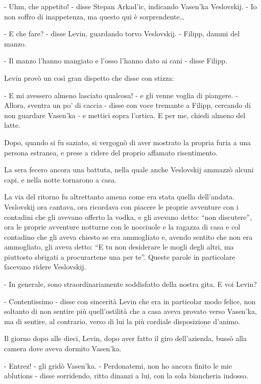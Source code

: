 - Uhm, che appetito! - disse Stepan Arkad'ic, indicando Vasen'ka Veslovskij. - Io non soffro di inappetenza, ma questo qui è sorprendente\ldots{} 

- E che fare? - disse Levin, guardando torvo Veslovskij. - Filipp, dammi del manzo. 

- Il manzo l'hanno mangiato e l'osso l'hanno dato ai cani - disse Filipp. 

Levin provò un così gran dispetto che disse con stizza: 

- E mi avessero almeno lasciato qualcosa! - e gli venne voglia di piangere. - Allora, sventra un po' di caccia - disse con voce tremante a Filipp, cercando di non guardare Vasen'ka - e mettici sopra l'ortica. E per me, chiedi almeno del latte. 

Dopo, quando si fu saziato, si vergognò di aver mostrato la propria furia a una persona estranea, e prese a ridere del proprio affamato risentimento. 

La sera fecero ancora una battuta, nella quale anche Veslovskij ammazzò alcuni capi, e nella notte tornarono a casa. 

La via del ritorno fu altrettanto amena come era stata quella dell'andata. Veslovskij ora cantava, ora ricordava con piacere le proprie avventure con i contadini che gli avevano offerto la vodka, e gli avevano detto: ``non discutere'', ora le proprie avventure notturne con le nocciuole e la ragazza di casa e col contadino che gli aveva chiesto se era ammogliato e, avendo sentito che non era ammogliato, gli aveva detto: ``E tu non desiderare le mogli degli altri, ma piuttosto sbrigati a procurartene una per te''. Queste parole in particolare facevano ridere Veslovskij. 

- In generale, sono straordinariamente soddisfatto della nostra gita. E voi Levin? 

- Contentissimo - disse con sincerità Levin che era in particolar modo felice, non soltanto di non sentire più quell'ostilità che a casa aveva provato verso Vasen'ka, ma di sentire, al contrario, verso di lui la più cordiale disposizione d'animo. 

\label{xiv-5} 

Il giorno dopo alle dieci, Levin, dopo aver fatto il giro dell'azienda, bussò alla camera dove aveva dormito Vasen'ka. 

- Entrez! - gli gridò Vasen'ka. - Perdonatemi, non ho ancora finito le mie ablutions - disse sorridendo, ritto dinanzi a lui, con la sola biancheria indosso. 

